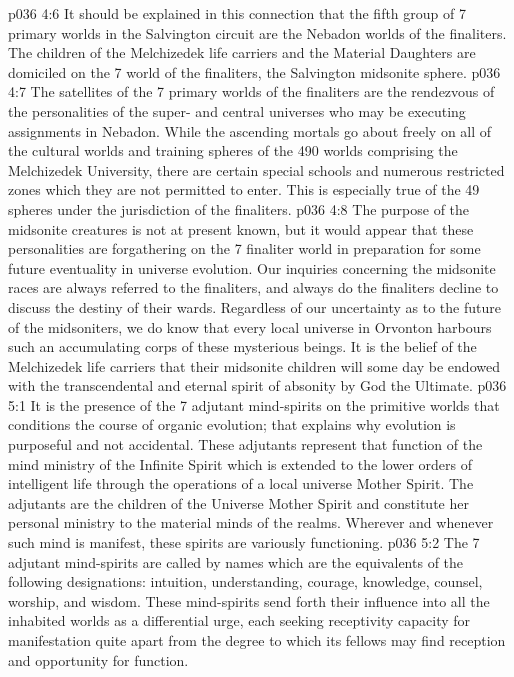 \vs p036 4:6 It should be explained in this connection that the fifth group of 7 primary worlds in the Salvington circuit are the Nebadon worlds of the finaliters. The children of the Melchizedek life carriers and the Material Daughters are domiciled on the 7 world of the finaliters, the Salvington midsonite sphere.
\vs p036 4:7 The satellites of the 7 primary worlds of the finaliters are the rendezvous of the personalities of the super\hyp{} and central universes who may be executing assignments in Nebadon. While the ascending mortals go about freely on all of the cultural worlds and training spheres of the 490 worlds comprising the Melchizedek University, there are certain special schools and numerous restricted zones which they are not permitted to enter. This is especially true of the 49 spheres under the jurisdiction of the finaliters.
\vs p036 4:8 \pc The purpose of the midsonite creatures is not at present known, but it would appear that these personalities are forgathering on the 7 finaliter world in preparation for some future eventuality in universe evolution. Our inquiries concerning the midsonite races are always referred to the finaliters, and always do the finaliters decline to discuss the destiny of their wards. Regardless of our uncertainty as to the future of the midsoniters, we do know that every local universe in Orvonton harbours such an accumulating corps of these mysterious beings. It is the belief of the Melchizedek life carriers that their midsonite children will some day be endowed with the transcendental and eternal spirit of absonity by God the Ultimate.
\vs p036 5:1 It is the presence of the 7 adjutant mind\hyp{}spirits on the primitive worlds that conditions the course of organic evolution; that explains why evolution is purposeful and not accidental. These adjutants represent that function of the mind ministry of the Infinite Spirit which is extended to the lower orders of intelligent life through the operations of a local universe Mother Spirit. The adjutants are the children of the Universe Mother Spirit and constitute her personal ministry to the material minds of the realms. Wherever and whenever such mind is manifest, these spirits are variously functioning.
\vs p036 5:2 The 7 adjutant mind\hyp{}spirits are called by names which are the equivalents of the following designations: intuition, understanding, courage, knowledge, counsel, worship, and wisdom. These mind\hyp{}spirits send forth their influence into all the inhabited worlds as a differential urge, each seeking receptivity capacity for manifestation quite apart from the degree to which its fellows may find reception and opportunity for function.

